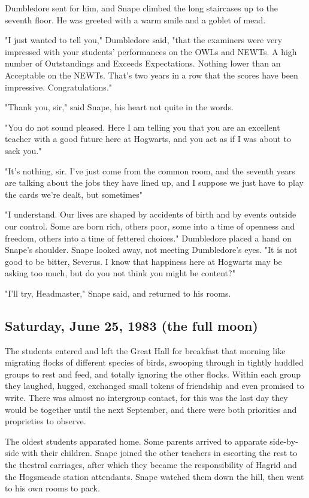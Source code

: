 Dumbledore sent for him, and Snape climbed the long staircases up to the seventh floor. He was greeted with a warm smile and a goblet of mead.

"I just wanted to tell you," Dumbledore said, "that the examiners were very impressed with your students' performances on the OWLs and NEWTs. A high number of Outstandings and Exceeds Expectations. Nothing lower than an Acceptable on the NEWTs. That's two years in a row that the scores have been impressive. Congratulations."

"Thank you, sir," said Snape, his heart not quite in the words.

"You do not sound pleased. Here I am telling you that you are an excellent teacher with a good future here at Hogwarts, and you act as if I was about to sack you."

"It's nothing, sir. I've just come from the common room, and the seventh years are talking about the jobs they have lined up, and{\el} I suppose we just have to play the cards we're dealt, but sometimes{\el}"

"I understand. Our lives are shaped by accidents of birth and by events outside our control. Some are born rich, others poor, some into a time of openness and freedom, others into a time of fettered choices." Dumbledore placed a hand on Snape's shoulder. Snape looked away, not meeting Dumbledore's eyes. "It is not good to be bitter, Severus. I know that happiness here at Hogwarts may be asking too much, but do you not think you might be content?"

"I'll try, Headmaster," Snape said, and returned to his rooms.

\subsection{Saturday, June 25, 1983 (the full moon)}

The students entered and left the Great Hall for breakfast that morning like migrating flocks of different species of birds, swooping through in tightly huddled groups to rest and feed, and totally ignoring the other flocks. Within each group they laughed, hugged, exchanged small tokens of friendship and even promised to write. There was almost no intergroup contact, for this was the last day they would be together until the next September, and there were both priorities and proprieties to observe.

The oldest students apparated home. Some parents arrived to apparate side-by-side with their children. Snape joined the other teachers in escorting the rest to the thestral carriages, after which they became the responsibility of Hagrid and the Hogsmeade station attendants. Snape watched them down the hill, then went to his own rooms to pack.


